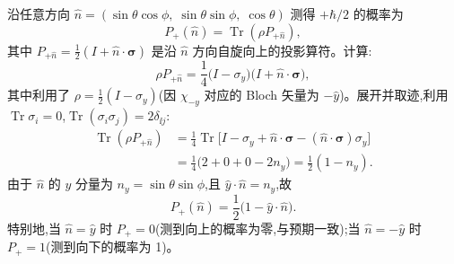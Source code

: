 \begin{question}
\begin{solution}
沿任意方向 $\hat n = (\sin\theta\cos\phi,\;\sin\theta\sin\phi,\;\cos\theta)$ 测得 $+\hbar/2$ 的概率为
\[
P_+(\hat n) = \operatorname{Tr}(\rho P_{+\hat n}),
\]
其中 $P_{+\hat n} = \frac{1}{2}(I+\hat n\cdot\boldsymbol\sigma)$ 是沿 $\hat n$ 方向自旋向上的投影算符。计算:
\[
\rho P_{+\hat n} = \frac{1}{4}\bigl(I-\sigma_y\bigr)\bigl(I+\hat n\cdot\boldsymbol\sigma\bigr),
\]
其中利用了 $\rho = \frac{1}{2}(I-\sigma_y)$(因 $\chi_{-y}$ 对应的 Bloch 矢量为 $-\hat y$)。展开并取迹,利用 $\operatorname{Tr}\sigma_i=0$,$\operatorname{Tr}(\sigma_i\sigma_j)=2\delta_{\ii j}$:
\[
\begin{aligned}
\operatorname{Tr}(\rho P_{+\hat n})
&= \frac{1}{4}\operatorname{Tr}\bigl[I - \sigma_y + \hat n\cdot\boldsymbol\sigma - (\hat n\cdot\boldsymbol\sigma)\sigma_y\bigr]\\[2mm]
&= \frac{1}{4}\bigl(2 + 0 + 0 - 2 n_y\bigr)
= \frac{1}{2}(1 - n_y).
\end{aligned}
\]
由于 $\hat n$ 的 $y$ 分量为 $n_y = \sin\theta\sin\phi$,且 $\hat y\cdot\hat n = n_y$,故
\[
\boxed{P_+(\hat n) = \frac{1}{2}\bigl(1 - \hat y\cdot\hat n\bigr).}
\]
特别地,当 $\hat n = \hat y$ 时 $P_+ = 0$(测到向上的概率为零,与预期一致);当 $\hat n = -\hat y$ 时 $P_+ = 1$(测到向下的概率为 1)。
\end{solution}
\end{question}

